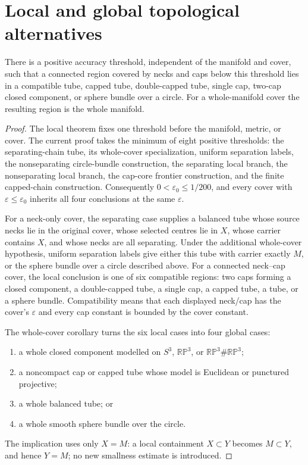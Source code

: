 \section{Local and global topological alternatives}
\label{sec:m25}

\begin{theorem}
\label{thm:neck-cap-cover}
There is a positive accuracy threshold, independent of the manifold and
cover, such that a connected region covered by necks and caps below this
threshold lies in a compatible tube, capped tube, double-capped tube,
single cap, two-cap closed component, or sphere bundle over a circle.
For a whole-manifold cover the resulting region is the whole manifold.
\end{theorem}

\begin{proof}
The local theorem fixes one threshold before the manifold, metric, or cover.
The current proof takes the minimum of eight positive thresholds: the
separating-chain tube, its whole-cover specialization, uniform separation
labels, the nonseparating circle-bundle construction, the separating local
branch, the nonseparating local branch, the cap-core frontier construction,
and the finite capped-chain construction.  Consequently
$0<\varepsilon_0\le 1/200$, and every cover with $\varepsilon\le\varepsilon_0$
inherits all four conclusions at the same $\varepsilon$.

For a neck-only cover, the separating case supplies a balanced tube whose
source necks lie in the original cover, whose selected centres lie in $X$,
whose carrier contains $X$, and whose necks are all separating.  Under the
additional whole-cover hypothesis, uniform separation labels give either this
tube with carrier exactly $M$, or the sphere bundle over a circle described
above.  For a connected neck--cap cover, the local conclusion is one of six
compatible regions: two caps forming a closed component, a double-capped tube,
a single cap, a capped tube, a tube, or a sphere bundle.  Compatibility means
that each displayed neck/cap has the cover's $\varepsilon$ and every cap
constant is bounded by the cover constant.

The whole-cover corollary turns the six local cases into four global cases:
\begin{enumerate}
\item a whole closed component modelled on $S^3$, $\mathbb{RP}^3$, or
      $\mathbb{RP}^3\#\mathbb{RP}^3$;
\item a noncompact cap or capped tube whose model is Euclidean or punctured
      projective;
\item a whole balanced tube; or
\item a whole smooth sphere bundle over the circle.
\end{enumerate}
The implication uses only $X=M$: a local containment $X\subset Y$ becomes
$M\subset Y$, and hence $Y=M$; no new smallness estimate is introduced.
\end{proof}

